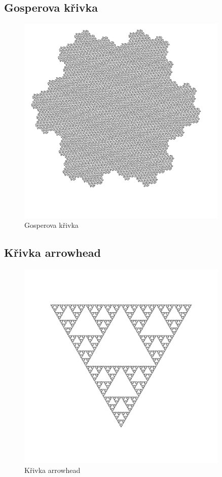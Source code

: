 \subsection{Gosperova křivka}



\begin{figure}[p]
  \centering

  \includegraphics[width=0.9\textwidth]{krunimir/examples/gosper}
  \caption{Gosperova křivka}\label{fig:krunimir-gosper}
\end{figure}

\subsection{Křivka arrowhead}



\begin{figure}[p]
  \centering

  \includegraphics[width=0.9\textwidth]{krunimir/examples/arrowhead}
  \caption{Křivka arrowhead}\label{fig:krunimir-arrowhead}
\end{figure}

